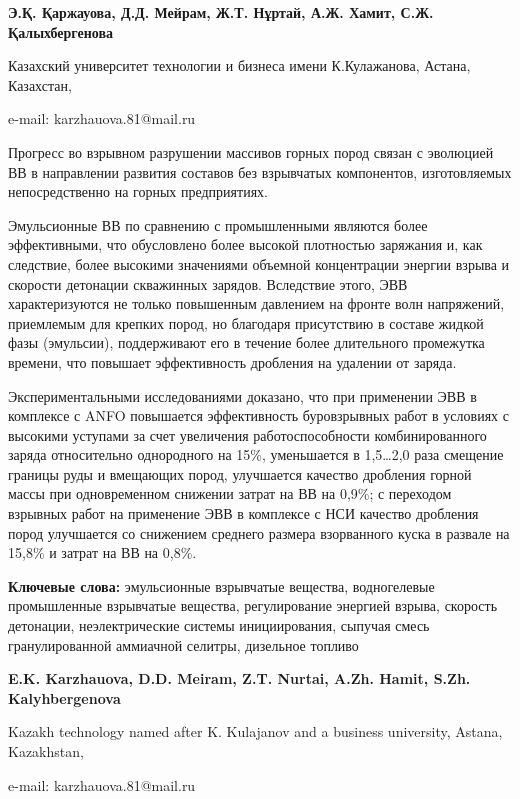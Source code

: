 \begin{center}
{\bfseries Э.Қ. Қаржауова\envelope, Д.Д. Мейрам, Ж.Т. Нұртай, А.Ж. Хамит, С.Ж.
Қалыхбергенова}

Казахский университет технологии и бизнеса имени К.Кулажанова, Астана,
Казахстан,

e-mail: karzhauova.81@mail.ru
\end{center}

Прогресс во взрывном разрушении массивов горных пород связан с эволюцией
ВВ в направлении развития составов без взрывчатых компонентов,
изготовляемых непосредственно на горных предприятиях.

Эмульсионные ВВ по сравнению с промышленными являются более
эффективными, что обусловлено более высокой плотностью заряжания и, как
следствие, более высокими значениями объемной концентрации энергии
взрыва и скорости детонации скважинных зарядов. Вследствие этого, ЭВВ
характеризуются не только повышенным давлением на фронте волн
напряжений, приемлемым для крепких пород, но благодаря присутствию в
составе жидкой фазы (эмульсии), поддерживают его в течение более
длительного промежутка времени, что повышает эффективность дробления на
удалении от заряда.

Экспериментальными исследованиями доказано, что при применении ЭВВ в
комплексе с ANFO повышается эффективность буровзрывных работ в условиях
с высокими уступами за счет увеличения работоспособности
комбинированного заряда относительно однородного на 15\%, уменьшается в
1,5\ldots2,0 раза смещение границы руды и вмещающих пород, улучшается
качество дробления горной массы при одновременном снижении затрат на ВВ
на 0,9\%; с переходом взрывных работ на применение ЭВВ в комплексе с НСИ
качество дробления пород улучшается со снижением среднего размера
взорванного куска в развале на 15,8\% и затрат на ВВ на 0,8\%.

{\bfseries Ключевые слова:} эмульсионные взрывчатые вещества, водногелевые
промышленные взрывчатые вещества, регулирование энергией взрыва,
скорость детонации, неэлектрические системы инициирования, сыпучая смесь
гранулированной аммиачной селитры, дизельное топливо


\begin{center}
{\bfseries E.K. Karzhauova\envelope, D.D. Meiram, Z.T. Nurtai, A.Zh. Hamit, S.Zh.
Kalyhbergenova}

Kazakh technology named after K. Kulajanov and a business university,
Astana, Kazakhstan,

e-mail: karzhauova.81@mail.ru
\end{center}

